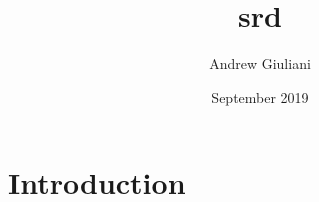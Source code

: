 \documentclass{article}
\title{srd}
\author{Andrew Giuliani}
\date{September 2019}
\begin{document}
\maketitle

\section{Introduction}
\end{document}
